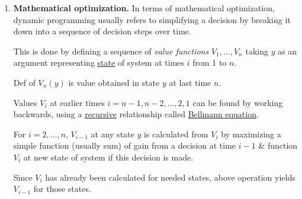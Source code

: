 \documentclass{article}
\begin{document}
\begin{enumerate}
	\item {\bf Mathematical optimization.} In terms of mathematical optimization, dynamic programming usually refers to simplifying a decision by breaking it down into a sequence of decision steps over time.

	This is done by defining a sequence of {\it value functions} $V_1,\ldots,V_n$ taking $y$ as an argument representing \href{https://en.wikipedia.org/wiki/State_variable}{state} of system at times $i$ from 1 to $n$.

	Def of $V_n(y)$ is value obtained in state $y$ at last time $n$.

	Values $V_i$ at earlier times $i = n - 1,n - 2,\ldots,2,1$ can be found by working backwards, using a \href{https://en.wikipedia.org/wiki/Recursion}{recursive} relationship called \href{https://en.wikipedia.org/wiki/Bellman_equation}{Bellmann equation}.

	For $i = 2,\ldots,n$, $V_{i-1}$ at any state $y$ is calculated from $V_i$ by maximizing a simple function (usually sum) of gain from a decision at time $i - 1$ \& function $V_i$ at new state of system if this decision is made.

	Since $V_i$ has already been calculated for needed states, above operation yields $V_{i-1}$ for those states.


\end{enumerate}
\end{document}
